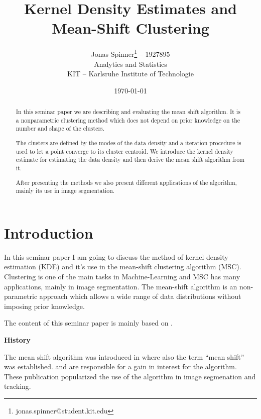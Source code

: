 \documentclass{article}
\begin{document}
\title{Kernel Density Estimates and Mean-Shift Clustering}
\author{Jonas Spinner\thanks{jonas.spinner@student.kit.edu} \enspace -- 1927895\\
	Analytics and Statistics\\
	KIT -- Karlsruhe Institute of Technologie}
\date{\today}
\maketitle

\newpage

\tableofcontents

\newpage

\listoffigures

\listoftables

\listofalgorithms

\newpage


\begin{abstract}
	In this seminar paper we are describing and evaluating the mean shift algorithm. It is a nonparametric clustering method which does not depend on prior knowledge on the number and shape of the clusters.
	
	The clusters are defined by the modes of the data density and a iteration procedure is used to let a point converge to its cluster centroid. We introduce the kernel density estimate for estimating the data density and then derive the mean shift algorithm from it.
	
	After presenting the methods we also present different applications of the algorithm, mainly its use in image segmentation.
\end{abstract}

\section{Introduction}

In this seminar paper I am going to discuss the method of kernel density estimation (KDE) and it's use in the mean-shift clustering algorithm (MSC). Clustering is one of the main tasks in Machine-Learning and MSC has many applications, mainly in image segmentation. The mean-shift algorithm is an non-parametric approach which allows a wide range of data distributions without imposing prior knowledge.

The content of this seminar paper is mainly based on \cite{Comaniciu.2002}.

\textbf{History}

The mean shift algorithm was introduced in \cite{Fukunaga.1975} where also the term ``mean shift'' was established. \cite{Comaniciu.2002} and \cite{Comaniciu.2003} are responsible for a gain in interest for the algorithm. These publication popularized the use of the algorithm in image segmenation and tracking.
\end{document}
